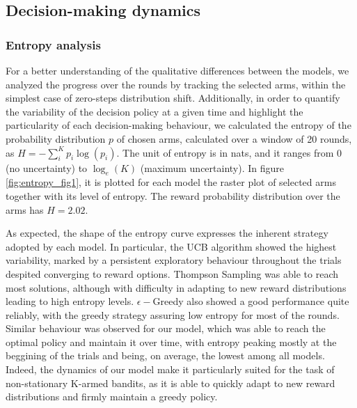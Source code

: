\subsection{Decision-making dynamics}

\subsubsection{Entropy analysis}\label{sec:entropy}
\noindent For a better understanding of the qualitative differences between the models, we analyzed the progress over the rounds by tracking the selected arms, within the simplest case of zero-steps distribution shift.
Additionally, in order to quantify the variability of the decision policy at a given time and highlight the particularity of each decision-making behaviour, we calculated the entropy of the probability distribution $p$ of chosen arms, calculated over a window of 20 rounds, as $H=-\sum^{K}_{i} p_{i}\log(p_{i})$.
The unit of entropy is in nats, and it ranges from $0$ (no uncertainty) to $\log_{e}(K)$ (maximum uncertainty).
In figure \ref{fig:entropy_fig1}, it is plotted for each model the raster plot of selected arms together with its level of entropy. The reward probability distribution over the arms has $H=2.02$.

As expected, the shape of the entropy curve expresses the inherent strategy adopted by each model.
In particular, the UCB algorithm showed the highest variability, marked by a persistent exploratory behaviour throughout the trials despited converging to reward options. Thompson Sampling was able to reach most solutions, although with difficulty in adapting to new reward distributions
leading to high entropy levels.
$\epsilon-$Greedy also showed a good performance quite reliably, with the greedy strategy assuring low entropy for most of the rounds.
Similar behaviour was observed for our model, which was able to reach the optimal policy and maintain it over time, with entropy peaking mostly at the beggining of the trials and being, on average, the lowest among all models.
Indeed, the dynamics of our model make it particularly suited for the task of non-stationary K-armed bandits, as it is able to quickly adapt to new reward distributions and firmly maintain a greedy policy.

